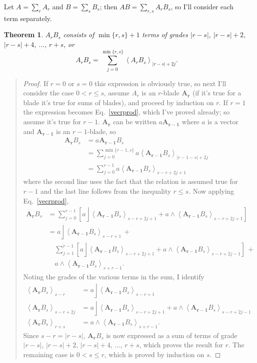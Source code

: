 \documentclass{utarticle}
\newcommand{\bl}[1]{\ensuremath{\bm{#1}}}
\DeclareMathOperator{\lin}{\rfloor}
\DeclareMathOperator{\out}{\wedge}
\newcommand{\grade}[2][]{\ensuremath{\left\langle #2 \right\rangle_{#1}}}
\newtheorem{thm}{Theorem}
\newcommand{\bp}{\begin{quotation} \begin{proof}}
\newcommand{\ep}{\end{proof} \end{quotation}}
\begin{document}
Let $A = \sum_r A_r$ and $B = \sum_s B_s$; then $AB = \sum_{r,s} A_r
B_s$, so I'll consider each term separately.
\begin{thm}
$A_r B_s$ consists of $\min\{r,s\}+1$ terms of grades $|r-s|$, $|r-s|+2$,
$|r-s|+4$, $\dotsc$, $r+s$, or
\begin{equation} 
A_r B_s = \sum_{j=0}^{\min\{r,s\}} \grade[|r-s|+2j]{A_r B_s}.
\end{equation}
\label{generalprod}
\end{thm}
\bp
If $r=0$ or $s=0$ this expression is obviously true, so next I'll
consider the case $ 0 < r \leq s$, assume $A_r$ is an $r$-blade \bl{A_r}
(if it's true for a blade it's true for sums of
blades), and proceed by induction on $r$.  If $r=1$ the expression
becomes Eq.~\eqref{vecrprod}, which I've proved already; so assume
it's true for $r-1$.  \bl{A_r} can be written $a \bl{A_{r-1}}$ where $a$ is a
vector and \bl{A_{r-1}} is an $r-1$-blade, so
\begin{align}
\bl{A_r} B_s & = a \bl{A_{r-1}} B_s \nonumber \\
 & = \sum_{j=0}^{\min\{r-1,s\}} a \grade[|r-1-s|+2j]{\bl{A_{r-1}} B_s} \nonumber \\
 & = \sum_{j=0}^{r-1} a \grade[s-r+2j+1]{\bl{A_{r-1}} B_s}
\end{align}
where the second line uses the fact that the relation is assumed true
for $r-1$ and the last line follows from the inequality $r \leq s$.
Now applying Eq.~\eqref{vecrprod},
\begin{align}
\bl{A_r} B_s & = \sum_{j=0}^{r-1} \left[ a \lin \grade[s-r+2j+1]{\bl{A_{r-1}} B_s} + 
     a \out \grade[s-r+2j+1]{\bl{A_{r-1}} B_s} \right] \nonumber \\
 & = a \lin \grade[s-r+1]{\bl{A_{r-1}} B_s} \, + \nonumber \\
 &   \quad \sum_{j=1}^{r-1} \left[a \lin \grade[s-r+2j+1]
     {\bl{A_{r-1}} B_s} + a \out \grade[s-r+2j-1]{\bl{A_{r-1}} B_s} 
     \right] \, + \nonumber \\
 &   \quad a \out \grade[s+r-1]{\bl{A_{r-1}} B_s}.
\label{expandedprod} 
\end{align}
Noting the grades of the various terms in the sum, I identify
\begin{align}
\grade[s-r]{\bl{A_r} B_s} & = a \lin \grade[s-r+1]{\bl{A_{r-1}} B_s} 
    \nonumber \\
\grade[s-r+2j]{\bl{A_r} B_s} & = a \lin \grade[s-r+2j+1]{\bl{A_{r-1}} B_s} 
    + a \out \grade[s-r+2j-1]{\bl{A_{r-1}} B_s} \label{terms} \\
\grade[r+s]{\bl{A_r} B_s} & =  a \out \grade[s+r-1]{\bl{A_{r-1}} B_s}.
     \nonumber
\end{align}
Since $s-r=|r-s|$, $\bl{A_r} B_s$ is now expressed as a sum of terms of
grade $|r-s|$, $|r-s|+2$, $|r-s|+4$, $\dotsc$, $r+s$, which proves the
result for $r$.  The remaining case is $0 < s \leq r$, which is proved
by induction on $s$.
\ep
\end{document}
